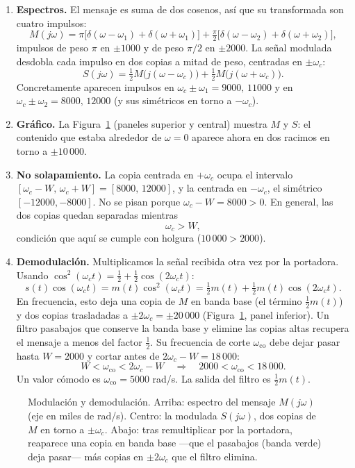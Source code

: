 \documentclass[10pt,a4paper]{article}
\begin{document}
	\begin{enumerate}[label=\textbf{\alph*)}]
		\item \textbf{Espectros.} El mensaje es suma de dos cosenos, así que su transformada son cuatro impulsos:
		\[
			M(j\omega)=\pi\big[\delta(\omega-\omega_1)+\delta(\omega+\omega_1)\big]+\tfrac{\pi}{2}\big[\delta(\omega-\omega_2)+\delta(\omega+\omega_2)\big],
		\]
		impulsos de peso $\pi$ en $\pm1000$ y de peso $\pi/2$ en $\pm2000$. La señal modulada desdobla cada impulso en dos copias a mitad de peso, centradas en $\pm\omega_c$:
		\[
			\boxed{S(j\omega)=\tfrac12 M\big(j(\omega-\omega_c)\big)+\tfrac12 M\big(j(\omega+\omega_c)\big).}
		\]
		Concretamente aparecen impulsos en $\omega_c\pm\omega_1=9000,\,11000$ y en $\omega_c\pm\omega_2=8000,\,12000$ (y sus simétricos en torno a $-\omega_c$).

		\item \textbf{Gráfico.} La Figura~\ref{fig:sol_ej17} (paneles superior y central) muestra $M$ y $S$: el contenido que estaba alrededor de $\omega=0$ aparece ahora en dos racimos en torno a $\pm10\,000$.

		\item \textbf{No solapamiento.} La copia centrada en $+\omega_c$ ocupa el intervalo $[\omega_c-W,\,\omega_c+W]=[8000,\,12000]$, y la centrada en $-\omega_c$, el simétrico $[-12000,-8000]$. No se pisan porque $\omega_c-W=8000>0$. En general, las dos copias quedan separadas mientras
		\[
			\boxed{\omega_c > W,}
		\]
		condición que aquí se cumple con holgura ($10\,000>2000$).

		\item \textbf{Demodulación.} Multiplicamos la señal recibida otra vez por la portadora. Usando $\cos^2(\omega_c t)=\tfrac12+\tfrac12\cos(2\omega_c t)$:
		\[
			s(t)\cos(\omega_c t)=m(t)\cos^2(\omega_c t)=\tfrac12 m(t)+\tfrac12 m(t)\cos(2\omega_c t).
		\]
		En frecuencia, esto deja una copia de $M$ en banda base (el término $\tfrac12 m(t)$) y dos copias trasladadas a $\pm2\omega_c=\pm20\,000$ (Figura~\ref{fig:sol_ej17}, panel inferior). Un filtro pasabajos que conserve la banda base y elimine las copias altas recupera el mensaje a menos del factor $\tfrac12$. Su frecuencia de corte $\omega_{\text{co}}$ debe dejar pasar hasta $W=2000$ y cortar antes de $2\omega_c-W=18\,000$:
		\[
			W < \omega_{\text{co}} < 2\omega_c - W
			\quad\Longrightarrow\quad
			2000 < \omega_{\text{co}} < 18\,000.
		\]
		Un valor cómodo es $\omega_{\text{co}}=5000$ rad/s. La salida del filtro es $\tfrac12 m(t)$.
	\end{enumerate}

	\begin{figure}[H]
		\centering
		
		\caption{Modulación y demodulación. Arriba: espectro del mensaje $M(j\omega)$ (eje en miles de rad/s). Centro: la modulada $S(j\omega)$, dos copias de $M$ en torno a $\pm\omega_c$. Abajo: tras remultiplicar por la portadora, reaparece una copia en banda base ---que el pasabajos (banda verde) deja pasar--- más copias en $\pm2\omega_c$ que el filtro elimina.}
		\label{fig:sol_ej17}
	\end{figure}
\end{document}
